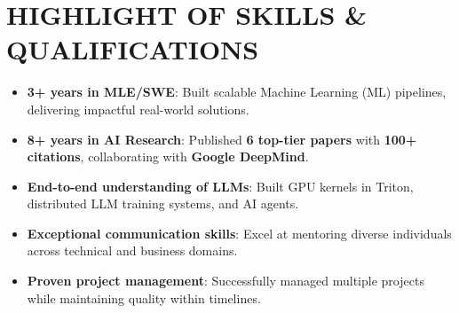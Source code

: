 \section{HIGHLIGHT OF SKILLS \& QUALIFICATIONS}
\begin{itemize}
    \item \textbf{3+ years in MLE/SWE}: Built scalable Machine Learning (ML) pipelines, delivering impactful real-world solutions.
    \item \textbf{8+ years in AI Research}: Published \textbf{6 top-tier papers} with \textbf{100+ citations}, collaborating with \textbf{Google DeepMind}.
    \item \textbf{End-to-end understanding of LLMs}: Built GPU kernels in Triton, distributed LLM training systems, and AI agents.
    \item \textbf{Exceptional communication skills}: Excel at mentoring diverse individuals across technical and business domains.
    \item \textbf{Proven project management}: Successfully managed multiple projects while maintaining quality within timelines.
\end{itemize}